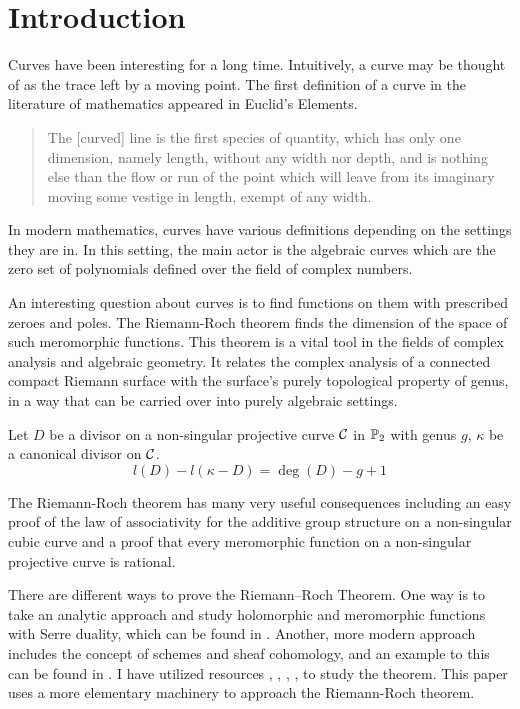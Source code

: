 \section{Introduction}

Curves have been interesting for a long time. Intuitively, a curve may be thought of as the trace left by a moving point. The first definition of a curve in the literature of mathematics appeared in Euclid's Elements.

\begin{quote}
    The [curved] line is the first species of quantity, which has only one dimension, namely length, without any width nor depth, and is nothing else than the flow or run of the point which will leave from its imaginary moving some vestige in length, exempt of any width.
\end{quote}

In modern mathematics, curves have various definitions depending on the settings they are in. In this setting, the main actor is the algebraic curves which are the zero set of polynomials defined over the field of complex numbers.

An interesting question about curves is to find functions on them with prescribed zeroes and poles. The Riemann-Roch theorem finds the dimension of the space of such meromorphic functions. This theorem is a vital tool in the fields of complex analysis and algebraic geometry. It relates the complex analysis of a connected compact Riemann surface with the surface's purely topological property of genus, in a way that can be carried over into purely algebraic settings.

\begin{maintheorem*}
    Let $D$ be a divisor on a non-singular projective curve $\mathcal C$ in $\mathbb P_2$ with genus $g$, $\kappa$ be a canonical divisor on $\mathcal C$.
    $$l(D)-l(\kappa-D)=\deg(D)-g+1$$
\end{maintheorem*}

The Riemann-Roch theorem has many very useful consequences including an easy proof of the law of associativity for the additive group structure on a non-singular cubic curve and a proof that every meromorphic function on a non-singular projective curve is rational.

There are different ways to prove the Riemann–Roch Theorem. One way is to take an analytic approach and study holomorphic and meromorphic functions with Serre duality, which can be found in \cite{ref:miranda}. Another, more modern approach includes the concept of schemes and sheaf cohomology, and an example to this can be found in \cite{ref:hartshorne}. I have utilized resources \cite{ref:kirwan}, \cite{ref:fulton}, \cite{ref:keith}, \cite{ref:hampus}, \cite{ref:terrytao} to study the theorem. This paper uses a more elementary machinery to approach the Riemann-Roch theorem.
